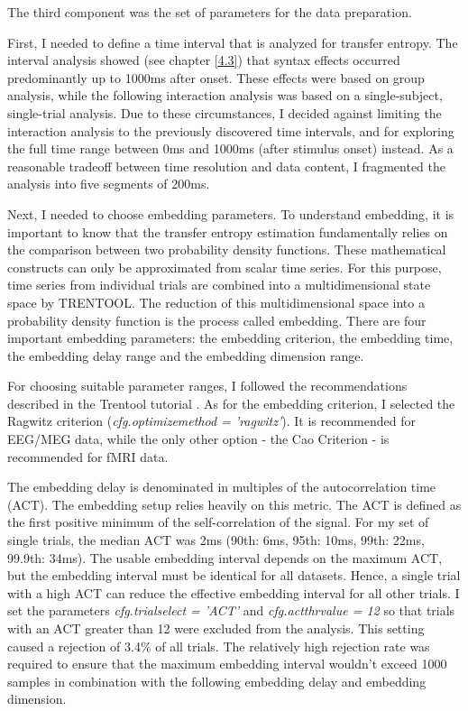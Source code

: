 The third component was the set of parameters for the data preparation.

First, I needed to define a time interval that is analyzed for transfer entropy.
The interval analysis showed (see chapter \ref{4.3}) that syntax effects occurred predominantly up to 1000ms after onset.
These effects were based on group analysis, while the following interaction analysis was based on a single-subject, single-trial analysis.
Due to these circumstances, I decided against limiting the interaction analysis to the previously discovered time intervals, and for exploring the full time range between 0ms and 1000ms (after stimulus onset) instead.
As a reasonable tradeoff between time resolution and data content, I fragmented the analysis into five segments of 200ms.

Next, I needed to choose embedding parameters.
To understand embedding, it is important to know that the transfer entropy estimation fundamentally relies on the comparison between two probability density functions.
These mathematical constructs can only be approximated from scalar time series.
For this purpose, time series from individual trials are combined into a multidimensional state space by TRENTOOL.
The reduction of this multidimensional space into a probability density function is the process called embedding.
There are four important embedding parameters: the embedding criterion, the embedding time, the embedding delay range and the embedding dimension range.

For choosing suitable parameter ranges, I followed the recommendations described in the Trentool tutorial \cite{3.3.TrentoolTutorial}.
As for the embedding criterion, I selected the Ragwitz criterion (\emph{cfg.optimizemethod = 'ragwitz'}).
It is recommended for EEG/MEG data, while the only other option - the Cao Criterion - is recommended for fMRI data.

The embedding delay is denominated in multiples of the autocorrelation time (ACT).
The embedding setup relies heavily on this metric.
The ACT is defined as the first positive minimum of the self-correlation of the signal.
For my set of single trials, the median ACT was 2ms (90th: 6ms, 95th: 10ms, 99th: 22ms, 99.9th: 34ms).
The usable embedding interval depends on the maximum ACT, but the embedding interval must be identical for all datasets.
Hence, a single trial with a high ACT can reduce the effective embedding interval for all other trials.
I set the parameters \emph{cfg.trialselect = 'ACT'} and \emph{cfg.actthrvalue = 12} so that trials with an ACT greater than 12 were excluded from the analysis.
This setting caused a rejection of 3.4\% of all trials.
The relatively high rejection rate was required to ensure that the maximum embedding interval wouldn't exceed 1000 samples in combination with the following embedding delay and embedding dimension.

